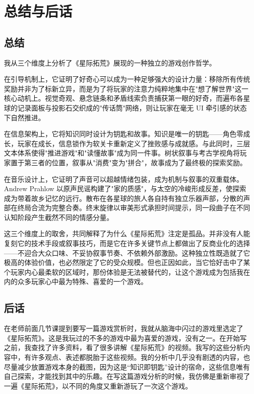 \section{总结与后话}

\subsection{总结}

我从三个维度上分析了《星际拓荒》展现的一种独立的游戏创作哲学。

在引导机制上，它证明了好奇心可以成为一种足够强大的设计力量：移除所有传统奖励并非为了标新立异，而是为了将玩家的注意力纯粹地集中在"想了解世界"这一核心动机上。视觉奇观、悬念链条和矛盾线索负责捕获第一眼的好奇，而遍布各星球的记录面板与投影石交织成的"传话筒"网络，则让玩家在毫无 UI 牵引感的状态下自然推进。

在信息架构上，它将知识同时设计为钥匙和故事。知识是唯一的钥匙——角色零成长，玩家在成长，信息锁作为软关卡重新定义了挫败感与成就感。与此同时，三层文本体系使得"推进游戏"和"读懂故事"成为同一件事。树状叙事与考古学视角将玩家置于第三者的位置，叙事从"消费"变为"拼合"，故事成为了最终极的探索奖励。

在音乐设计上，它证明了声音可以超越情绪包装，成为机制与叙事的双重载体。Andrew Prahlow 以原声民谣构建了"家的质感"，与太空的冷峻形成反差，使探索成为带着故乡记忆的远行。散布在各星球的旅人各自持有独立乐器声部，分散的声部在终局合流为完整合奏。终末旋律以审美形式承担时间提示，同一段曲子在不同认知阶段产生截然不同的情感分量。

这三个维度上的取舍，共同解释了为什么《星际拓荒》注定是孤品。并非没有人能复刻它的技术手段或叙事技巧，而是它在许多关键节点上都做出了反商业化的选择——不迎合大众口味、不妥协叙事节奏、不依赖外部激励。这种独立性既造就了它极高的体验价值，也必然限定了它的受众规模。但也正因如此，当它恰好击中了某个玩家内心最柔软的区域时，那份体验是无法被替代的，让这个游戏成为包括我在内的众多玩家心中最为特殊、喜爱的一个游戏。

\subsection{后话}

在老师前面几节课提到要写一篇游戏赏析时，我就从脑海中闪过的游戏里选定了《星际拓荒》。这是我玩过的不多的游戏中最为喜爱的游戏，没有之一。在开始写之前，我查找了许多资料，看了很多讲解《星际拓荒》的视频。我写的这些分析内容中，有许多观点、表述都脱胎于这些视频。我的分析中几乎没有剧透的内容，也尽量减少放置游戏本身的截图，因为这是“知识即钥匙”设计的宿命，这些信息唯有自己探索，才能找到其中的乐趣。在写这篇游戏分析的时候，我仿佛是重新审视了一遍《星际拓荒》，以不同的角度又重新游玩了一次这个游戏。

